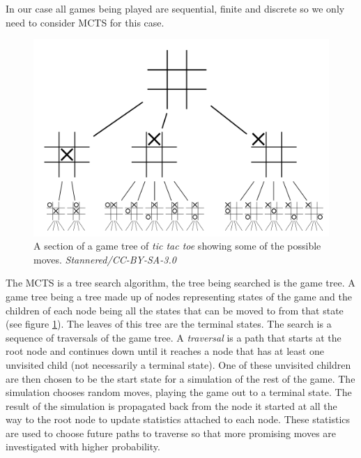 In our case all games being played are sequential, finite and discrete so we only need to consider MCTS for this case.

\begin{figure}[ht]
	\centering
	\includegraphics[width=0.9\linewidth]{Tic-tac-toe-game-tree.png}
	\caption{A section of a game tree of \textit{tic tac toe} showing some of the possible moves. \textit{Stannered/CC-BY-SA-3.0}}
	\label{fig:game-tree}
\end{figure}

The MCTS is a tree search algorithm, the tree being searched is the game tree. A game tree being a tree made up of nodes representing states of the game and the children of each node being all the states that can be moved to from that state (see figure \ref{fig:game-tree}). The leaves of this tree are the terminal states. The search is a sequence of traversals of the game tree. A \textit{traversal} is a path that starts at the root node and continues down until it reaches a node that has at least one unvisited child (not necessarily a terminal state). One of these unvisited children are then chosen to be the start state for a simulation of the rest of the game. The simulation chooses random moves, playing the game out to a terminal state. The result of the simulation is propagated back from the node it started at all the way to the root node to update statistics attached to each node. These statistics are used to choose future paths to traverse so that more promising moves are investigated with higher probability.

